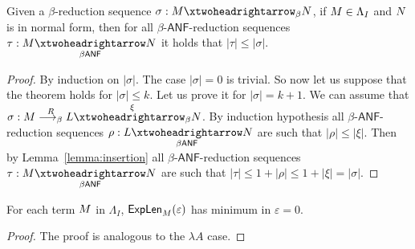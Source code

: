 \begin{theorem}\label{theorem:revstd}
	Given a $\beta$-reduction sequence
	$\sigma:\termone \redbetared{} \termtwo$, if $M\in \Lambda_I$ and $N$ is in normal form, then for all $\beta$-$\mathsf{ANF}$-reduction sequences $\tau:\termone\redbetaredanf{} \termtwo$ it holds that $|\tau|\leq |\sigma|$.
\end{theorem}
\begin{proof}
	By induction on $|\sigma|$. The case $|\sigma|=0$ is trivial. So now let us suppose that the theorem holds for $|\sigma|\leq k$. Let us prove it for $|\sigma|= k+1$. We can assume that $\sigma:\termone \redbetardx{\rdxone}  \termthree \redbetared{\xi}   \termtwo$.
	By induction hypothesis all $\beta$-$\mathsf{ANF}$-reduction sequences $\rho:\termthree \redbetaredanf{} \termtwo$ are such that $|\rho|\leq |\xi|$. Then by Lemma~\ref{lemma:insertion} all $\beta$-$\mathsf{ANF}$-reduction sequences $\tau:\termone\redbetaredanf{} \termtwo$ are such that $|\tau|\leq 1+|\rho|\leq 1+|\xi|=|\sigma|$.
\end{proof}
\begin{corollary}
	For each term $M$ in $\Lambda_{I}$, $\textsf{ExpLen}_{M}(\varepsilon)$ has minimum in $\varepsilon=0$.
\end{corollary}
\begin{LONG}
	\begin{proof}
		The proof is analogous to the $\lambda A$ case.
	\end{proof}
\end{LONG}
